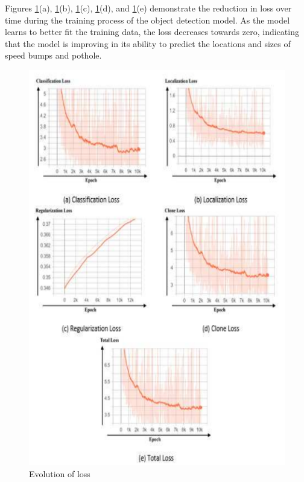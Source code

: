 Figures \ref{fig:loss_func}(a), \ref{fig:loss_func}(b), \ref{fig:loss_func}(c), \ref{fig:loss_func}(d), and \ref{fig:loss_func}(e) demonstrate the reduction in loss over time during the training process of the object detection model. As the model learns to better fit the training data, the loss decreases towards zero, indicating that the model is improving in its ability to predict the locations and sizes of speed bumps and pothole.
\begin{figure}[H]
    \centering
    \includegraphics{Figures/chapter4/loss_function.png}
    \caption{Evolution of loss}
    \label{fig:loss_func}
\end{figure}

